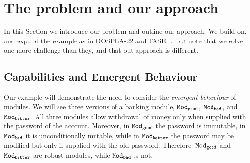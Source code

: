

\section{The problem and our approach}
\label{s:outline}
 
In this Section we introduce our problem and outline our approach. 
 We build on, and expand the  example as in OOSPLA-22 and FASE. .. but note that we solve one more challenge than they, and that out approach is different.
 

 \subsection{Capabilities and Emergent Behaviour} %
\label{s:bank}
Our example will demonstrate the need to consider the \emph{emergent behaviour} of modules. 
We will see three versions of a banking module, ${\texttt{Mod}}_{{\texttt{good}}}$, ${\texttt{Mod}}_{{\texttt{bad}}}$, and ${\texttt{Mod}}_{{\texttt{better}}}$.
All three modules allow withdrawal of  money only when supplied with the password of the account.
Moreover, in ${\texttt{Mod}}_{{\texttt{good}}}$ the password is immutable, in ${\texttt{Mod}}_{{\texttt{bad}}}$ it is unconditionally mutable, while in ${\texttt{Mod}}_{{\texttt{better}}}$ the password may be modified but only if supplied with the old password. 
Therefore, ${\texttt{Mod}}_{{\texttt{good}}}$ and ${\texttt{Mod}}_{{\texttt{better}}}$ are robust modules, while  ${\texttt{Mod}}_{{\texttt{bad}}}$ is not.


\vspace{.1cm}




